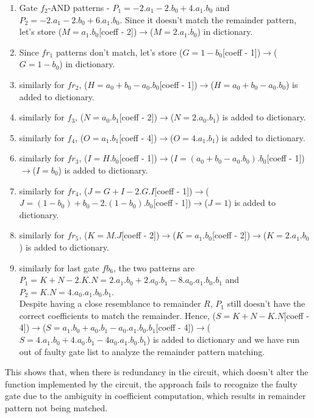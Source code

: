 \documentclass{article}
\begin{document}
\begin{enumerate}
    \item Gate $f_2$-AND patterns - $P_1 = -2.a_1-2.b_0+4.a_1.b_0$ and $P_2 = -2.a_1-2.b_0+6.a_1.b_0$. Since it doesn't match the remainder pattern, let's store ($M=a_1.b_0$[coeff - 2])$\rightarrow$($M=2.a_1.b_0$) in dictionary.
    \item Since $fr_1$ patterns don't match, let's store ($G=1-b_0$[coeff - 1])$\rightarrow$($G=1-b_0$) in dictionary.
    \item similarly for $fr_2$, ($H=a_0+b_0-a_0.b_0$[coeff - 1])$\rightarrow$($H=a_0+b_0-a_0.b_0$) is added to dictionary.
    \item similarly for $f_3$, ($N=a_0.b_1$[coeff - 2])$\rightarrow$($N=2.a_0.b_1$) is added to dictionary.
    \item similarly for $f_4$, ($O=a_1.b_1$[coeff - 4])$\rightarrow$($O=4.a_1.b_1$) is added to dictionary.
    \item similarly for $fr_3$, ($I=H.b_0$[coeff - 1])$\rightarrow$($I=(a_0+b_0-a_0.b_0).b_0$[coeff - 1])$\rightarrow$($I=b_0$) is added to dictionary.
    \item similarly for $fr_4$, ($J=G+I-2.G.I$[coeff - 1])$\rightarrow$($J=(1-b_0)+b_0-2.(1-b_0).b_0$[coeff - 1])$\rightarrow$($J=1$) is added to dictionary.
    \item similarly for $fr_5$, ($K=M.J$[coeff - 2])$\rightarrow$($K=a_1.b_0$[coeff - 2])$\rightarrow$($K=2.a_1.b_0$) is added to dictionary.
    \item similarly for last gate $fb_6$, the two patterns are $P_1 = K+N-2.K.N = 2.a_1.b_0+2.a_0.b_1-8.a_0.a_1.b_0.b_1$ and $P_2 = K.N = 4.a_0.a_1.b_0.b_1$.\\
    
    Despite having a close resemblance to remainder $R$, $P_1$ still doesn't have the correct coefficients to match the remainder. Hence,
    ($S=K+N-K.N$[coeff - 4])$\rightarrow$($S=a_1.b_0+a_0.b_1-a_0.a_1.b_0.b_1$[coeff - 4])$\rightarrow$($S=4.a_1.b_0+4.a_0.b_1-4a_0.a_1.b_0.b_1$) is added to dictionary and we have run out of faulty gate list to analyze the remainder pattern matching.
\end{enumerate}

This shows that, when there is redundancy in the circuit, which doesn't alter the function implemented by the circuit, the approach fails to recognize the faulty gate due to the ambiguity in coefficient computation, which results in remainder pattern not being matched.  


\end{document}
